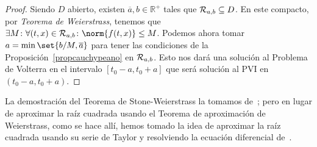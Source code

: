 \documentclass[11pt]{article}
\theoremstyle{plain}
\theoremstyle{definition}
\theoremstyle{remark}
\begin{document}
\begin{proof}
  Siendo $D$ abierto, existen $\overline{a},b \in \mathbb{R}^{+}$ tales que
  ${\cal{R}}_{a,b} \subseteq D$. En este compacto, por \textit{Teorema de Weierstrass},
  tenemos que $\exists M\colon \forall (t,x) \in \eR_{a,b}\colon \norm{f(t,x)} \leq M$.
  Podemos ahora tomar $a = \min \set{b/M,\overline{a}}$ para tener las condiciones
  de la Proposición~\ref{propcauchypeano} en ${\cal{R}}_{a,b}$. Esto nos dará una solución al
  Problema de Volterra en el intervalo $[t_0-a,t_0+a]$ que será solución al PVI
  en $(t_0-a,t_0+a)$.
\end{proof}





La demostración del Teorema de Stone-Weierstrass la tomamos
de~\cite{rudin64}; pero en lugar de aproximar la raíz cuadrada usando el
Teorema de aproximación de Weierstrass, como se hace allí, 
hemos tomado la idea de aproximar la raíz cuadrada usando su serie de
Taylor y resolviendo la ecuación diferencial de~\cite{queen}.
\end{document}
